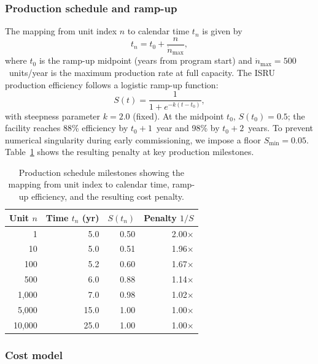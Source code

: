 \documentclass[preprint,12pt]{elsarticle}
\begin{document}
\subsubsection{Production schedule and ramp-up}

The mapping from unit index $n$ to calendar time $t_n$ is given by
\begin{equation}
  t_n = t_0 + \frac{n}{\dot{n}_{\max}},
  \label{eq:production_schedule}
\end{equation}
where $t_0$ is the ramp-up midpoint (years from program start) and $\dot{n}_{\max} = 500$~units/year is the maximum production rate at full capacity. The ISRU production efficiency follows a logistic ramp-up function:
\begin{equation}
  S(t) = \frac{1}{1 + e^{-k(t - t_0)}},
  \label{eq:scurve}
\end{equation}
with steepness parameter $k = 2.0$ (fixed). At the midpoint $t_0$, $S(t_0) = 0.5$; the facility reaches 88\% efficiency by $t_0 + 1$~year and 98\% by $t_0 + 2$~years. To prevent numerical singularity during early commissioning, we impose a floor $S_{\min} = 0.05$. Table~\ref{tab:production_schedule} shows the resulting penalty at key production milestones.

\begin{table}[htbp]
\centering
\caption{Production schedule milestones showing the mapping from unit index to calendar time, ramp-up efficiency, and the resulting cost penalty.}
\label{tab:production_schedule}
\small
\begin{tabular}{@{}rrrr@{}}
\toprule
Unit $n$ & Time $t_n$ (yr) & $S(t_n)$ & Penalty $1/S$ \\
\midrule
1      & 5.0  & 0.50 & 2.00$\times$ \\
10     & 5.0  & 0.51 & 1.96$\times$ \\
100    & 5.2  & 0.60 & 1.67$\times$ \\
500    & 6.0  & 0.88 & 1.14$\times$ \\
1{,}000  & 7.0  & 0.98 & 1.02$\times$ \\
5{,}000  & 15.0 & 1.00 & 1.00$\times$ \\
10{,}000 & 25.0 & 1.00 & 1.00$\times$ \\
\bottomrule
\end{tabular}
\end{table}

\subsubsection{Cost model}
\end{document}
